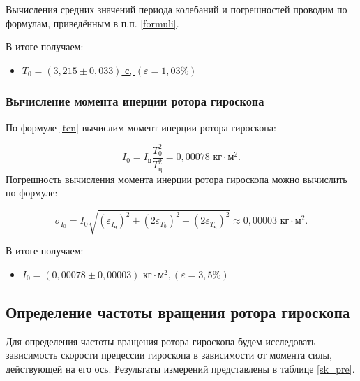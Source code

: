 \documentclass[a4paper,12pt]{article} %
\begin{document}
Вычисления средних значений периода колебаний и погрешностей проводим по формулам, приведённым в п.п. \ref{formuli}.

В итоге получаем:

\begin{itemize}
	\item \underline{$ T_0 = \left( 3,215 \pm 0,033 \right) $ с, $ \left( \varepsilon = 1,03 \% \right)  $}
\end{itemize}

\subsubsection{Вычисление момента инерции ротора гироскопа}

По формуле \eqref{ten} вычислим момент инерции ротора гироскопа:

\begin{equation}
I_0=I_\text{ц}\frac{T_0^2}{T_\text{ц}^2} = 0,00078 \text{ кг} \cdot \text{м}^2.
\end{equation}
Погрешность вычисления момента инерции ротора гироскопа можно вычислить по формуле:

\begin{equation}
\sigma_{I_0} = I_0\sqrt{\left( \varepsilon_{I_\text{ц}} \right)^2 +\left( 2 \varepsilon_{T_0} \right)^2 + \left(2 \varepsilon_{T_\text{ц}} \right)^2} \approx 0,00003 \text{ кг} \cdot \text{м}^2.
\end{equation}

В итоге получаем: \label{inertion}

\begin{itemize}
	\item \underline{$ I_0 = \left( 0,00078 \pm 0,00003 \right) \text{ кг} \cdot \text{м}^2, \left( \varepsilon = 3,5   \% \right) $}
\end{itemize}

\subsection{Определение частоты вращения ротора гироскопа}

Для определения частоты вращения ротора гироскопа будем исследовать зависимость скорости прецессии гироскопа в зависимости от момента силы, действующей на его ось. Результаты измерений представлены в таблице \ref{sk_pre}.
\end{document}
